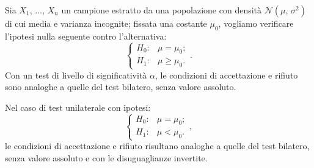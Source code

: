             \begin{defn}[Unilaterale]
                Sia $X_1,\, \ldots,\, X_{n}$ un campione estratto da una popolazione con densità 
                $\mathcal{N}(\mu,\,\sigma^2)$ di cui media e varianza incognite; fissata una costante $\mu_0$, 
                vogliamo verificare l'ipotesi nulla seguente contro l'alternativa: \[
                    \begin{cases}
                        H_0 : & \mu = \mu_0; \\
                        H_1 : & \mu \geq \mu_0.
                    \end{cases}
                .\] Con un test di livello di significatività $\alpha$, le condizioni di accettazione e 
                rifiuto sono analoghe a quelle del test bilatero, senza valore assoluto.
            \end{defn}
            \begin{obsv}
                Nel caso di test unilaterale con ipotesi: \[
                    \begin{cases}
                        H_0 : & \mu = \mu_0; \\
                        H_1 : & \mu < \mu_0.
                    \end{cases}
                ,\] le condizioni di accettazione e rifiuto risultano analoghe a quelle del test bilatero, senza 
                valore assoluto e con le disuguaglianze invertite.
            \end{obsv}
